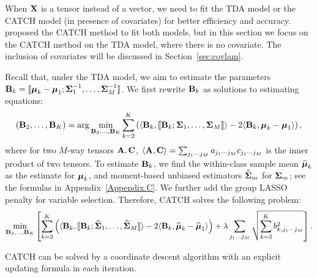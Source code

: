When $\mathbf{X}$ is a tensor instead of a vector, we need to fit the TDA model or the CATCH model (in presence of covariates) for better efficiency and accuracy. \cite{catch} proposed the CATCH method to fit both models, but in this section we focus on the CATCH method on the TDA model, where there is no covariate. The inclusion of covariates will be discussed in Section~\ref{sec:covlam}.

Recall that, under the TDA model, we aim to estimate the parameters $\mathbf{B}_k=\llbracket \boldsymbol{\mu}_k-\boldsymbol{\mu}_1;\boldsymbol{\Sigma}_1^{-1},\ldots,\boldsymbol{\Sigma}_M^{-1}\rrbracket$. We first rewrite $\mathbf{B}_k$ as solutions to estimating equations:
$$
(\mathbf{B}_2,\ldots,\mathbf{B}_K)=\arg\min_{\mathbf{B}_2,\ldots,\mathbf{B}_K}\sum_{k=2}^K\left(\langle\mathbf{B}_k,\llbracket\mathbf{B}_k;\boldsymbol{\Sigma}_{1},\dots,\boldsymbol{\Sigma}_{M}\rrbracket\rangle-2\langle\mathbf{B}_k,\boldsymbol{\mu}_{k}-\boldsymbol{\mu}_{1}\rangle\right),
$$
where for two $M$-way tensors $\mathbf{A},\mathbf{C}$, $\langle\mathbf{A},\mathbf{C}\rangle=\sum_{j_1\cdots j_M}a_{j_1\cdots j_M}c_{j_1\cdots j_M}$ is the inner product of two tensors. To estimate $\mathbf{B}_k$, we find the within-class sample mean $\widehat{\boldsymbol{\mu}}_k$ as the estimate for $\boldsymbol{\mu}_k$, and moment-based unbiased estimators $\widehat{\boldsymbol{\Sigma}}_{m}$ for $\boldsymbol{\Sigma}_{m}$; see the formulas in Appendix~\ref{Appendix.C}. We further add the group LASSO penalty for variable selection. Therefore, CATCH solves the following problem:
\begin{equation}\label{TLDA-formula}
\min_{\mathbf{B}_2,\ldots,\mathbf{B}_K}\left[\sum_{k=2}^K\left(\langle\mathbf{B}_k,\llbracket\mathbf{B}_k;\widehat{\boldsymbol{\Sigma}}_{1},\dots,\widehat{\boldsymbol{\Sigma}}_{M}\rrbracket\rangle-2\langle\mathbf{B}_k,\widehat{\boldsymbol{\mu}}_{k}-\widehat{\boldsymbol{\mu}}_{1}\rangle\right)
+\lambda\sum_{j_{1}\dots j_{M}}\sqrt{\sum_{k=2}^{K}b_{k,j_{1}\cdots j_{M}}^2}\right].
\end{equation}

CATCH can be solved by a coordinate descent algorithm with an explicit updating formula in each iteration. 







